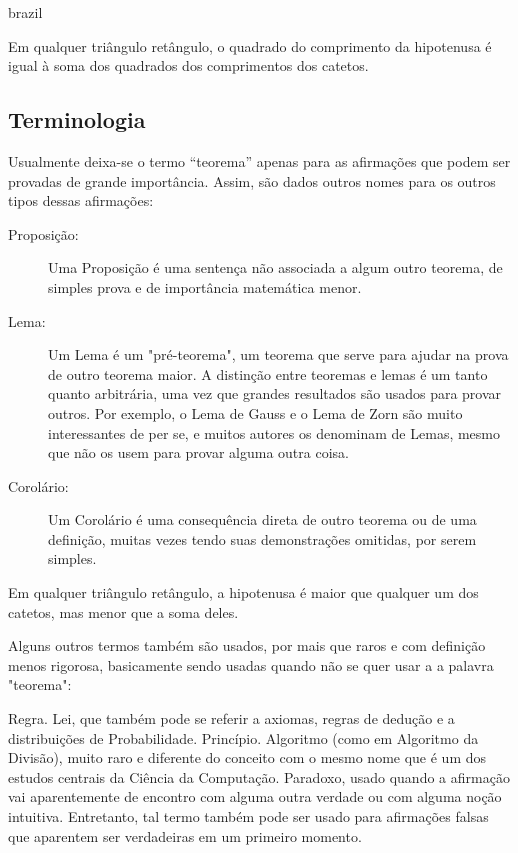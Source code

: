 \begin{otherlanguage*}{brazil}
\begin{teorema}
    Em qualquer triângulo retângulo, o quadrado do comprimento da hipotenusa é igual à soma dos quadrados dos comprimentos dos catetos.
\end{teorema}


\subsection{Terminologia}



Usualmente deixa-se o termo ``teorema'' apenas para as afirmações que podem ser provadas de grande importância. Assim, são dados outros nomes para os outros tipos dessas afirmações:

\begin{description}
    \item[Proposição:] Uma Proposição é uma sentença não associada a algum outro teorema, de simples prova e de importância matemática menor.
    \item[Lema:] Um Lema é um "pré-teorema", um teorema que serve para ajudar na prova de outro teorema maior. A distinção entre teoremas e lemas é um tanto quanto arbitrária, uma vez que grandes resultados são usados para provar outros. Por exemplo, o Lema de Gauss e o Lema de Zorn são muito interessantes de per se, e muitos autores os denominam de Lemas, mesmo que não os usem para provar alguma outra coisa.
    \item[Corolário:] Um Corolário é uma consequência direta de outro teorema ou de uma definição, muitas vezes tendo suas demonstrações omitidas, por serem simples.
\end{description}


\begin{corolario}
    Em qualquer triângulo retângulo, a hipotenusa é maior que qualquer um dos catetos, mas menor que a soma deles.
\end{corolario}

Alguns outros termos também são usados, por mais que raros e com definição menos rigorosa, basicamente sendo usadas quando não se quer usar a a palavra "teorema":

Regra.
Lei, que também pode se referir a axiomas, regras de dedução e a distribuições de Probabilidade.
Princípio.
Algoritmo (como em Algoritmo da Divisão), muito raro e diferente do conceito com o mesmo nome que é um dos estudos centrais da Ciência da Computação.
Paradoxo, usado quando a afirmação vai aparentemente de encontro com alguma outra verdade ou com alguma noção intuitiva. Entretanto, tal termo também pode ser usado para afirmações falsas que aparentem ser verdadeiras em um primeiro momento.


\end{otherlanguage*}

